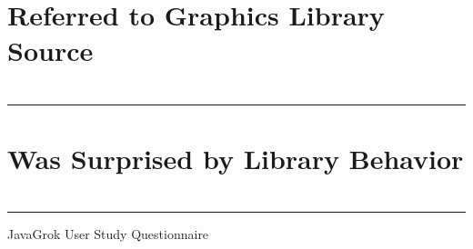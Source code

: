 \documentclass{article}
\begin{document}
\section*{Referred to Graphics Library Source}
\section*{}
\section*{}
\hrule
\vspace{0.2in}


\section*{Was Surprised by Library Behavior}
\section*{}
\section*{}
\hrule
\vspace{0.2in}

\newpage

\begin{center}
\LARGE JavaGrok User Study Questionnaire
\end{center}
\end{document}

